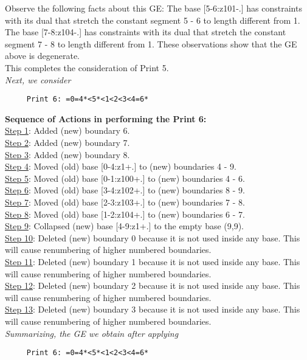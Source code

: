 \documentclass[final]{article}
\begin{document}
Observe the following facts about this GE:
The base [5-6:z101-.]  has constraints with its dual that stretch the constant segment 5 - 6 to length different from 1.  The base [7-8:z104-.]  has constraints with its dual that stretch the constant segment 7 - 8 to length different from 1.  These observations show that the GE above is degenerate.\\[0.1in]
This completes the consideration of Print 5.\\[0.1in]
{\em Next, we consider}
\begin{verbatim}
     Print 6: =0=4*<5*<1<2<3<4=6*
\end{verbatim}
{\bf Sequence of Actions in performing the Print 6:}\\
{\underline{Step 1}:} Added (new) boundary 6.\\
{\underline{Step 2}:} Added (new) boundary 7.\\
{\underline{Step 3}:} Added (new) boundary 8.\\
{\underline{Step 4}:} Moved (old) base [0-4:z1+.]  to (new) boundaries 4 - 9.\\
{\underline{Step 5}:} Moved (old) base [0-1:z100+.]  to (new) boundaries 4 - 6.\\
{\underline{Step 6}:} Moved (old) base [3-4:z102+.]  to (new) boundaries 8 - 9.\\
{\underline{Step 7}:} Moved (old) base [2-3:z103+.]  to (new) boundaries 7 - 8.\\
{\underline{Step 8}:} Moved (old) base [1-2:z104+.]  to (new) boundaries 6 - 7.\\
{\underline{Step 9}:} Collapsed (new) base [4-9:z1+.]  to the empty base (9,9).
\\
{\underline{Step 10}:} Deleted (new) boundary 0 because it is not used inside any base.  This will cause renumbering of higher numbered boundaries.
\\
{\underline{Step 11}:} Deleted (new) boundary 1 because it is not used inside any base.  This will cause renumbering of higher numbered boundaries.
\\
{\underline{Step 12}:} Deleted (new) boundary 2 because it is not used inside any base.  This will cause renumbering of higher numbered boundaries.
\\
{\underline{Step 13}:} Deleted (new) boundary 3 because it is not used inside any base.  This will cause renumbering of higher numbered boundaries.
\\[0.1in]
{\em Summarizing, the GE we obtain after applying}
\begin{verbatim}
     Print 6: =0=4*<5*<1<2<3<4=6*
\end{verbatim}
\end{document}
